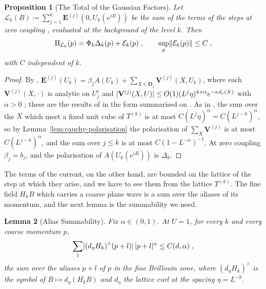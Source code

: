 \documentclass[11pt]{preprint}
\DeclarePairedDelimiter{\abs}{\lvert}{\rvert}
\DeclarePairedDelimiter{\norm}{\lVert}{\rVert}
\numberwithin{equation}{section}
\newtheorem{lemma}{Lemma}[section]
\theoremstyle{definition}
\theoremstyle{remark}
\theoremstyle{plain}
\newtheorem{auxproposition}[lemma]{Proposition}
\begin{document}
\begin{auxproposition}[The Total of the Gaussian Factors]\label{prop:gaussian-total}
Let $\mathcal L_k(B) \coloneqq \sum_{j=1}^k\mathbf E^{(j)}(0, U_k(e^{iB}))$ be the sum of the terms of the steps at zero coupling \cite[(1.6), p.~261]{BalabanRG1}, evaluated at the background of the level $k$. Then
\begin{equation}\label{eq:gaussian-total}
    \Pi_{\mathcal L_k}(p) = \Phi_k\Delta_k(p) + \mathcal E_k(p)\;,
    \qquad
    \sup_p\norm{\mathcal E_k(p)} \leq C\;,
\end{equation}
with $C$ independent of $k$.
\end{auxproposition}

\begin{proof}
By \cite[(0.28), p.~258]{BalabanRG1}, $\mathbf E^{(j)}(U_k) = \beta_jA(U_k) + \sum_{X \in \mathbf D_j}\mathbf V^{(j)}(X, U_k)$, where each $\mathbf V^{(j)}(X, \cdot)$ is analytic on $U^c_j$ and $\abs{\mathbf V^{(j)}(X, U)} \leq O(1)(L^j\eta)^{4+\alpha}e^{-\kappa d_j(X)}$ with $\alpha > 0$ \cite[(0.29)]{BalabanRG1}; these are the results of \cite[Sects.~3--5]{BalabanRG1} in the form summarised on \cite[p.~258]{BalabanRG1}. As in \cite[(0.30)]{BalabanRG1}, the sum over the $X$ which meet a fixed unit cube of $T^{(k)}$ is at most $C(L^j\eta)^\alpha = C(L^{j-k})^\alpha$, so by Lemma~\ref{lem:cauchy-polarisation} the polarisation of $\sum_X\mathbf V^{(j)}$ is at most $C(L^{j-k})^\alpha$, and the sum over $j \leq k$ is at most $C(1 - L^{-\alpha})^{-1}$. At zero coupling $\beta_j = b_j$, and the polarisation of $A(U_k(e^{iB}))$ is $\Delta_k$.
\end{proof}

The terms of the current, on the other hand, are bounded on the lattice of the step at which they arise, and we have to see them from the lattice $T^{(k)}$. The fine field $H_kB$ which carries a coarse plane wave is a sum over the aliases of its momentum, and the next lemma is the summability we need.

\begin{lemma}[Alias Summability]\label{lem:alias-summability}
Fix $\alpha \in (0, 1)$. At $U = 1$, for every $k$ and every coarse momentum $p$,
\begin{equation}\label{eq:alias-summability}
    \sum_l\abs{(d_\eta H_k)^\wedge(p + l)}\,\abs{p + l}^\alpha \leq C(d, \alpha)\;,
\end{equation}
the sum over the aliases $p + l$ of $p$ in the fine Brillouin zone, where $(d_\eta H_k)^\wedge$ is the symbol of $B \mapsto d_\eta(H_kB)$ and $d_\eta$ the lattice curl at the spacing $\eta = L^{-k}$.
\end{lemma}
\end{document}
